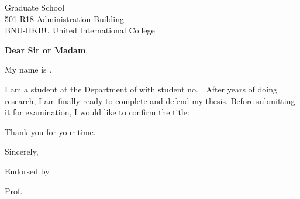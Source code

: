 \documentclass[10pt]{letter}
\begin{document}
\begin{letter}{Graduate School \\ 501-R18 Administration Building \\  BNU-HKBU United International College}


\opening{\textbf{Dear Sir or Madam},}

My name is {\normalsize \studentName}.

I am a {\normalsize \studentDegree} student at the Department of {\normalsize \studentDepartment} with student no. {\normalsize \studentID}.
After {\normalsize \studentYear} years of doing research, I am finally ready to complete and defend my thesis.
Before submitting it for examination, I would like to confirm the title:

\begin{center}
    {\bf \normalsize \studentTitle}
\end{center}

Thank you for your time.

\vspace{2\parskip} %
\closing{Sincerely,}
\vspace{2\parskip} %

Endorsed by

\vspace{2\parskip} %
\vspace{2\parskip} %

Prof. {\normalsize \advisor}

\end{letter}
 
\end{document}
